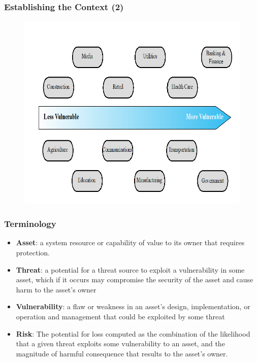 \documentclass[xcolor ={table,usenames,dvipsnames}]{beamer}
\theoremstyle{definition}
\begin{document}
	\begin{frame}
		\frametitle{Establishing the Context (2)}
		\begin{figure}[h!]
			\centering
			\includegraphics[scale=0.45]{img/img_11.PNG}
			\label{Interfacce di un CS}
		\end{figure}
	\end{frame}

	\begin{frame}
		\frametitle{Terminology}
			\begin{itemize}
				\item \textbf{Asset}: a system resource or capability of value to its owner that requires protection. 
				\item \textbf{Threat}: a potential for a threat source to exploit a vulnerability in some asset, which if it occurs may compromise the security of the asset and cause harm to the asset’s owner
				\item \textbf{Vulnerability}: a flaw or weakness in an asset’s design, implementation, or operation and management that could be exploited 		by some threat
				\item \textbf{Risk}: The potential for loss computed as the 	combination of the likelihood that a given threat exploits some vulnerability to an asset, and the magnitude of harmful consequence that results to the asset’s owner.
			\end{itemize}
	\end{frame}
\end{document}
